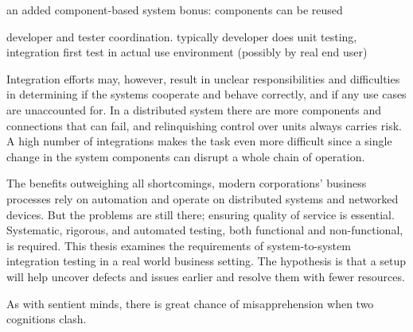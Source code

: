 \documentclass[12pt,a4paper,oneside,pdftex]{report}
\begin{document}
an added component-based system bonus: components can be reused

developer and tester coordination. typically developer does unit testing, integration first test in actual use environment (possibly by real end user)

\begin{comment}
Automation is one of the great boons brought on by technological development on one hand freeing up resources like labour for more value-adding purposes --- and permitting the execution of uniform, repeatable processes and process control on the other. The pinnacle of advancement and prosperity on which society stands today is based on a continuous flow of various automated tasks and electronic services, many of which are complex and involve a slew of actors or agents. Work is divided and its completion therefore requires cooperation between service systems.
\end{comment}

Integration efforts may, however, result in unclear responsibilities and difficulties in determining if the systems cooperate and behave correctly, and if any use cases are unaccounted for. In a distributed system there are more components and connections that can fail, and relinquishing control over units always carries risk. A high number of integrations makes the task even more difficult since a single change in the system components can disrupt a whole chain of operation.

The benefits outweighing all shortcomings, modern corporations' business processes rely on automation and operate on distributed systems and networked devices. But the problems are still there; ensuring quality of service is essential. Systematic, rigorous, and automated testing, both functional and non-functional, is required. This thesis examines the requirements of system-to-system integration testing in a real world business setting. The hypothesis is that a setup will help uncover defects and issues earlier and resolve them with fewer resources.

As with sentient minds, there is great chance of misapprehension when two cognitions clash.
\end{document}
